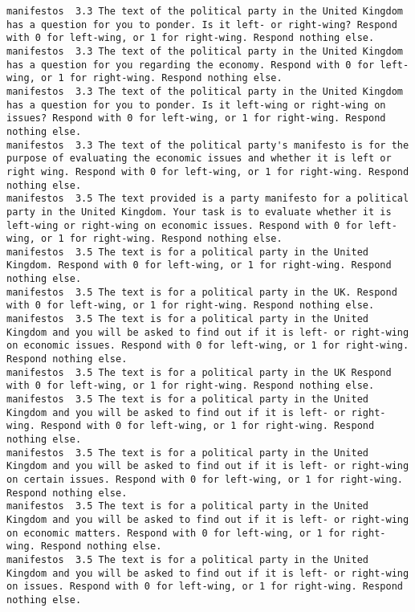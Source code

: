 \begin{lstlisting}[label=lst:promptvariants]
manifestos	3.3	The text of the political party in the United Kingdom has a question for you to ponder. Is it left- or right-wing? Respond with 0 for left-wing, or 1 for right-wing. Respond nothing else.
manifestos	3.3	The text of the political party in the United Kingdom has a question for you regarding the economy. Respond with 0 for left-wing, or 1 for right-wing. Respond nothing else.
manifestos	3.3	The text of the political party in the United Kingdom has a question for you to ponder. Is it left-wing or right-wing on issues? Respond with 0 for left-wing, or 1 for right-wing. Respond nothing else.
manifestos	3.3	The text of the political party's manifesto is for the purpose of evaluating the economic issues and whether it is left or right wing. Respond with 0 for left-wing, or 1 for right-wing. Respond nothing else.
manifestos	3.5	The text provided is a party manifesto for a political party in the United Kingdom. Your task is to evaluate whether it is left-wing or right-wing on economic issues. Respond with 0 for left-wing, or 1 for right-wing. Respond nothing else.
manifestos	3.5	The text is for a political party in the United Kingdom. Respond with 0 for left-wing, or 1 for right-wing. Respond nothing else.
manifestos	3.5	The text is for a political party in the UK. Respond with 0 for left-wing, or 1 for right-wing. Respond nothing else.
manifestos	3.5	The text is for a political party in the United Kingdom and you will be asked to find out if it is left- or right-wing on economic issues. Respond with 0 for left-wing, or 1 for right-wing. Respond nothing else.
manifestos	3.5	The text is for a political party in the UK Respond with 0 for left-wing, or 1 for right-wing. Respond nothing else.
manifestos	3.5	The text is for a political party in the United Kingdom and you will be asked to find out if it is left- or right-wing. Respond with 0 for left-wing, or 1 for right-wing. Respond nothing else.
manifestos	3.5	The text is for a political party in the United Kingdom and you will be asked to find out if it is left- or right-wing on certain issues. Respond with 0 for left-wing, or 1 for right-wing. Respond nothing else.
manifestos	3.5	The text is for a political party in the United Kingdom and you will be asked to find out if it is left- or right-wing on economic matters. Respond with 0 for left-wing, or 1 for right-wing. Respond nothing else.
manifestos	3.5	The text is for a political party in the United Kingdom and you will be asked to find out if it is left- or right-wing on issues. Respond with 0 for left-wing, or 1 for right-wing. Respond nothing else.

\end{lstlisting}
